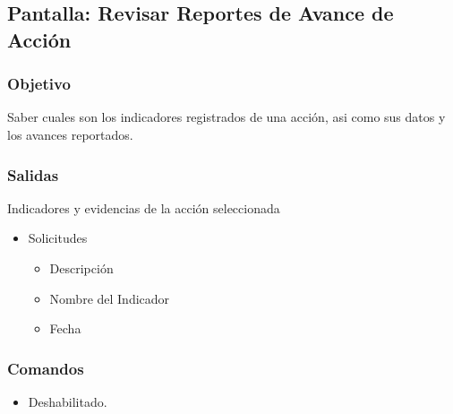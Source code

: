 \subsection{Pantalla: Revisar Reportes de Avance de Acción}
\subsubsection{Objetivo}
Saber cuales son los indicadores registrados de una acción, asi como sus datos y los avances reportados. %


\subsubsection{Salidas}
Indicadores y evidencias de la acción seleccionada
\begin{itemize}
\item Solicitudes
	\begin{itemize}
		\item Descripción
    \item Nombre del Indicador
    \item Fecha
		
	\end{itemize}
\end{itemize}

\subsubsection{Comandos}
\begin{itemize}
 \item {} Deshabilitado.

\end{itemize}


